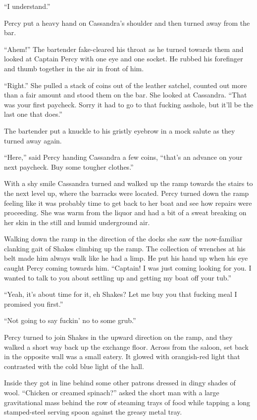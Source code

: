 \documentclass[]{scrbook}
\begin{document}
``I understand.''

Percy put a heavy hand on Cassandra's shoulder and then turned away from
the bar.

``Ahem!'' The bartender fake-cleared his throat as he turned towards
them and looked at Captain Percy with one eye and one socket. He rubbed
his forefinger and thumb together in the air in front of him.

``Right.'' She pulled a stack of coins out of the leather satchel,
counted out more than a fair amount and stood them on the bar. She
looked at Cassandra. ``That was your first paycheck. Sorry it had to go
to that fucking asshole, but it'll be the last one that does.''

The bartender put a knuckle to his gristly eyebrow in a mock salute as
they turned away again.

``Here,'' said Percy handing Cassandra a few coins, ``that's an advance
on your next paycheck. Buy some tougher clothes.''

With a shy smile Cassandra turned and walked up the ramp towards the
stairs to the next level up, where the barracks were located. Percy
turned down the ramp feeling like it was probably time to get back to
her boat and see how repairs were proceeding. She was warm from the
liquor and had a bit of a sweat breaking on her skin in the still and
humid underground air.

Walking down the ramp in the direction of the docks she saw the
now-familiar clanking gait of Shakes climbing up the ramp. The
collection of wrenches at his belt made him always walk like he had a
limp. He put his hand up when his eye caught Percy coming towards him.
``Captain! I was just coming looking for you. I wanted to talk to you
about settling up and getting my boat off your tub.''

``Yeah, it's about time for it, eh Shakes? Let me buy you that fucking
meal I promised you first.''

``Not going to say fuckin' no to some grub.''

Percy turned to join Shakes in the upward direction on the ramp, and
they walked a short way back up the exchange floor. Across from the
saloon, set back in the opposite wall was a small eatery. It glowed with
orangish-red light that contrasted with the cold blue light of the hall.

Inside they got in line behind some other patrons dressed in dingy
shades of wool. ``Chicken or creamed spinach?'' asked the short man with
a large gravitational mass behind the row of steaming trays of food
while tapping a long stamped-steel serving spoon against the greasy
metal tray.
\end{document}
